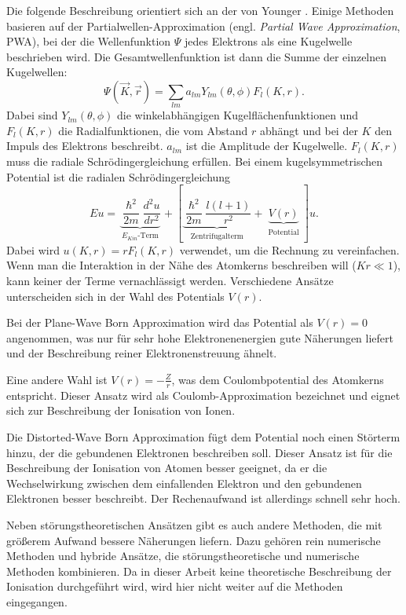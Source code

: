 Die folgende Beschreibung orientiert sich an der von Younger \cite{EII}. Einige Methoden basieren auf der Partialwellen-Approximation (engl. \textit{Partial Wave Approximation}, PWA), bei der die Wellenfunktion $\Psi$ jedes Elektrons als eine Kugelwelle beschrieben wird. Die Gesamtwellenfunktion ist dann die Summe der einzelnen Kugelwellen:
\begin{equation}
    \Psi (\vec K, \vec r) = \sum_{lm}a_{lm}Y_{lm}(\theta, \phi) F_l(K,r).
\end{equation}
Dabei sind $Y_{lm}(\theta,\phi)$ die winkelabhängigen Kugelflächenfunktionen und $F_l(K,r)$ die Radialfunktionen, die vom Abstand $r$ abhängt und bei der $K$ den Impuls des Elektrons beschreibt. $a_{lm}$ ist die Amplitude der Kugelwelle. $F_l(K,r)$ muss die radiale Schrödingergleichung erfüllen. Bei einem kugelsymmetrischen Potential ist die radialen Schrödingergleichung
\begin{equation}
    E u = \underbrace{\frac{\hslash^2}{2m}\frac{d^2 u}{dr^2}}_{\substack{\text{$E_{Kin}$-Term}}} + \left[\underbrace{\frac{\hslash^2}{2m} \frac{l(l+1)}{r^2}}_{\substack{\text{Zentrifugalterm}}} + \underbrace{V(r)}_{\substack{\text{Potential}}} \right] u.
\end{equation}
Dabei wird $u(K,r) = rF_l(K,r)$ verwendet, um die Rechnung zu vereinfachen.
Wenn man die Interaktion in der Nähe des Atomkerns beschreiben will ($Kr \ll 1$), kann keiner der Terme vernachlässigt werden. Verschiedene Ansätze unterscheiden sich in der Wahl des Potentials $V(r)$. 

Bei der Plane-Wave Born Approximation wird das Potential als $V(r) = 0$ angenommen, was nur für sehr hohe Elektronenenergien gute Näherungen liefert und der Beschreibung reiner Elektronenstreuung ähnelt.

Eine andere Wahl ist $V(r) = -\frac{Z}{r}$, was dem Coulombpotential des Atomkerns entspricht. Dieser Ansatz wird als Coulomb-Approximation bezeichnet und eignet sich zur Beschreibung der Ionisation von Ionen.

Die Distorted-Wave Born Approximation fügt dem Potential noch einen Störterm hinzu, der die gebundenen Elektronen beschreiben soll. Dieser Ansatz ist für die Beschreibung der Ionisation von Atomen besser geeignet, da er die Wechselwirkung zwischen dem einfallenden Elektron und den gebundenen Elektronen besser beschreibt. Der Rechenaufwand ist allerdings schnell sehr hoch.

Neben störungstheoretischen Ansätzen gibt es auch andere Methoden, die mit größerem Aufwand bessere Näherungen liefern. Dazu gehören rein numerische Methoden und hybride Ansätze, die störungstheoretische und numerische Methoden kombinieren. Da in dieser Arbeit keine theoretische Beschreibung der Ionisation durchgeführt wird, wird hier nicht weiter auf die Methoden eingegangen.

